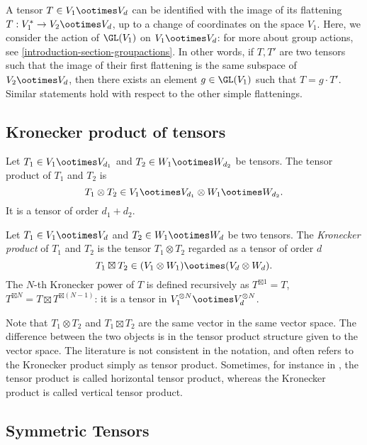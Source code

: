 A tensor $T \in V_1 \ootimes V_d$ can be identified with the image of its flattening $T : V_1^* \to V_2 \ootimes V_d$, up to a change of coordinates on the space $V_1$. Here, we consider the action of $\GL(V_1)$ on $V_1 \ootimes V_d$: for more about group actions, see \ref{introduction-section-groupactions}. In other words, if $T,T'$ are two tensors such that the image of their first flattening is the same subspace of $V_2 \ootimes V_d$, then there exists an element $g \in \GL(V_1)$ such that $T = g\cdot T'$. Similar statements hold with respect to the other simple flattenings.

\subsection{Kronecker product of tensors}
\label{introduction-subsection-kroneckerproducts}

Let $T_1 \in V_1 \ootimes V_{d_1}$ and $T_2 \in W_1 \ootimes W_{d_2}$ be tensors. The tensor product of $T_1$ and $T_2$ is 
\[
T_1 \otimes T_2 \in V_1 \ootimes V_{d_1} \otimes W_1 \ootimes W_{d_2}.
\]
It is a tensor of order $d_1+d_2$. 
\begin{definition}
\label{introduction-definition-kroneckerproducts}
Let $T_1 \in V_1 \ootimes V_{d}$ and $T_2 \in W_1 \ootimes W_{d}$ be two tensors. The {\it Kronecker product} of $T_1$ and $T_2$ is the tensor $T_1 \otimes T_2$ regarded as a tensor of order $d$
\[
T_1 \boxtimes T_2 \in (V_1 \otimes W_1) \ootimes (V_d \otimes W_d).
\]
The $N$-th Kronecker power of $T$ is defined recursively as $T^{\boxtimes 1} = T$, $T^{\boxtimes N} = T \boxtimes T^{\boxtimes (N-1)}$: it is a tensor in $V_1^{\otimes N} \ootimes V_d^{\otimes N}$.
\end{definition}
Note that $T_1 \otimes T_2$ and $T_1\boxtimes T_2$ are the same vector in the same vector space. The difference between the two objects is in the tensor product structure given to the vector space. The literature is not consistent in the notation, and often refers to the Kronecker product simply as tensor product. Sometimes, for instance in \cite{Der16}, the tensor product is called horizontal tensor product, whereas the Kronecker product is called vertical tensor product. 


\subsection{Symmetric Tensors}
\label{introduction-subsection-symmetric_tensors}

